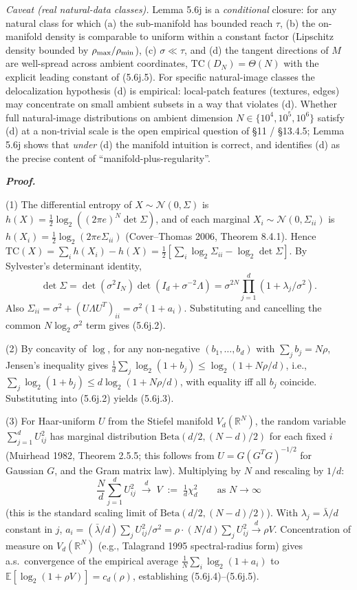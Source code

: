 \documentclass[
]{article}
\begin{document}
\emph{Caveat (real natural-data classes).} Lemma 5.6j is a
\emph{conditional} closure: for any natural class for which (a) the
sub-manifold has bounded reach $\tau$, (b) the on-manifold density is
comparable to uniform within a constant factor (Lipschitz density
bounded by $\rho_{\rm max}/\rho_{\rm min}$), (c) $\sigma \ll \tau$, and
(d) the tangent directions of $M$ are well-spread across ambient
coordinates, $\mathrm{TC}(D_N) = \Theta(N)$ with the explicit leading
constant of (5.6j.5). For specific natural-image classes the
delocalization hypothesis (d) is empirical: local-patch features
(textures, edges) may concentrate on small ambient subsets in a way
that violates (d). Whether full natural-image distributions on ambient
dimension $N \in \{10^4, 10^5, 10^6\}$ satisfy (d) at a non-trivial
scale is the open empirical question of \S 11 / \S 13.4.5; Lemma 5.6j
shows that \emph{under} (d) the manifold intuition is correct, and
identifies (d) as the precise content of ``manifold-plus-regularity''.

\emph{\textbf{Proof.}}

\noindent (1) The differential entropy of $X \sim \mathcal{N}(0,
\Sigma)$ is $h(X) = \tfrac{1}{2} \log_2((2\pi e)^N \det \Sigma)$, and
of each marginal $X_i \sim \mathcal{N}(0, \Sigma_{ii})$ is
$h(X_i) = \tfrac{1}{2} \log_2(2 \pi e \Sigma_{ii})$ (Cover--Thomas
2006, Theorem 8.4.1). Hence $\mathrm{TC}(X) = \sum_i h(X_i) - h(X)
= \tfrac{1}{2}[\sum_i \log_2 \Sigma_{ii} - \log_2 \det \Sigma]$.
By Sylvester's determinant identity,
\[
\det \Sigma = \det(\sigma^2 I_N) \det(I_d + \sigma^{-2} \Lambda)
= \sigma^{2N} \prod_{j=1}^d (1 + \lambda_j / \sigma^2).
\]
Also $\Sigma_{ii} = \sigma^2 + (U \Lambda U^T)_{ii} = \sigma^2 (1 +
a_i)$. Substituting and cancelling the common $N \log_2 \sigma^2$
term gives (5.6j.2).

\noindent (2) By concavity of $\log$, for any non-negative
$(b_1, \dots, b_d)$ with $\sum_j b_j = N\rho$, Jensen's inequality
gives $\tfrac{1}{d} \sum_j \log_2(1 + b_j) \leq \log_2(1 + N\rho/d)$,
i.e., $\sum_j \log_2(1 + b_j) \leq d \log_2(1 + N\rho/d)$, with
equality iff all $b_j$ coincide. Substituting into (5.6j.2) yields
(5.6j.3).

\noindent (3) For Haar-uniform $U$ from the Stiefel manifold
$V_d(\mathbb{R}^N)$, the random variable $\sum_{j=1}^d U_{ij}^2$ has
marginal distribution $\mathrm{Beta}(d/2, (N-d)/2)$ for each fixed
$i$ (Muirhead 1982, Theorem 2.5.5; this follows from $U = G(G^T
G)^{-1/2}$ for Gaussian $G$, and the Gram matrix law). Multiplying
by $N$ and rescaling by $1/d$:
\[
\frac{N}{d} \sum_{j=1}^d U_{ij}^2 \;\xrightarrow{d}\; V
\;:=\; \tfrac{1}{d}\chi^2_d \qquad \text{as } N \to \infty
\]
(this is the standard scaling limit of $\mathrm{Beta}(d/2,(N-d)/2)$).
With $\lambda_j = \bar\lambda/d$ constant in $j$,
$a_i = (\bar\lambda/d)\sum_j U_{ij}^2 / \sigma^2 = \rho \cdot
(N/d)\sum_j U_{ij}^2 \xrightarrow{d} \rho V$. Concentration of
measure on $V_d(\mathbb{R}^N)$ (e.g., Talagrand 1995 spectral-radius
form) gives a.s.\ convergence of the empirical average
$\tfrac{1}{N}\sum_i \log_2(1+a_i)$ to $\mathbb{E}[\log_2(1 + \rho V)]
= c_d(\rho)$, establishing (5.6j.4)--(5.6j.5).
\end{document}
